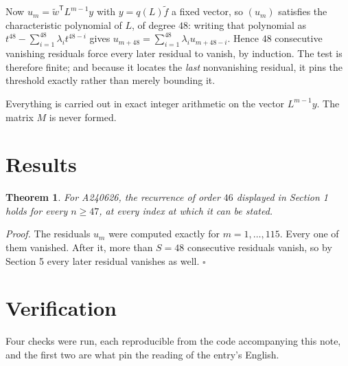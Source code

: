 \documentclass[11pt]{article}
\newtheorem{theorem}{Theorem}
\theoremstyle{definition}
\begin{document}
Now $u_m = \tilde w^{\mathsf T} L^{m-1} y$ with $y = q(L)\tilde f$ a fixed vector, so $(u_m)$ satisfies the characteristic polynomial of $L$, of degree $48$: writing that polynomial as $t^{48} - \sum_{i=1}^{48} \lambda_i t^{48-i}$ gives $u_{m+48} = \sum_{i=1}^{48} \lambda_i u_{m+48-i}$. Hence $48$ consecutive vanishing residuals force every later residual to vanish, by induction. The test is therefore finite; and because it locates the {\itshape last} nonvanishing residual, it pins the threshold exactly rather than merely bounding it.

Everything is carried out in exact integer arithmetic on the vector $L^{m-1}y$. The matrix $M$ is never formed.

\section{Results}

\begin{theorem} For A240626, the recurrence of order $46$ displayed in Section 1 holds for every $n \ge 47$, at every index at which it can be stated.\end{theorem}

{\itshape Proof.} The residuals $u_m$ were computed exactly for $m = 1,\dots,115$. Every one of them vanished. After it, more than $S = 48$ consecutive residuals vanish, so by Section 5 every later residual vanishes as well. $\square$

\section{Verification}

Four checks were run, each reproducible from the code accompanying this note, and the first two are what pin the reading of the entry's English.
\end{document}
